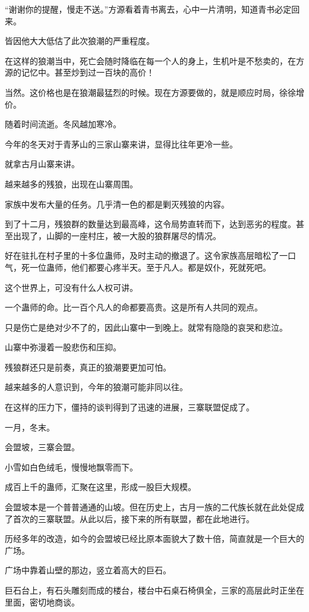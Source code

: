 \begin{this_body}
“谢谢你的提醒，慢走不送。”方源看着青书离去，心中一片清明，知道青书必定回来。

皆因他大大低估了此次狼潮的严重程度。

在这样的狼潮当中，死亡会随时降临在每一个人的身上，生机叶是不愁卖的，在方源的记忆中。甚至炒到过一百块的高价！

当然。这价格也是在狼潮最猛烈的时候。现在方源要做的，就是顺应时局，徐徐增价。

随着时间流逝。冬风越加寒冷。

今年的冬天对于青茅山的三家山寨来讲，显得比往年更冷一些。

就拿古月山寨来讲。

越来越多的残狼，出现在山寨周围。

家族中发布大量的任务。几乎清一色的都是剿灭残狼的内容。

到了十二月，残狼群的数量达到最高峰，这令局势直转而下，达到恶劣的程度。甚至出现了，山脚的一座村庄，被一大股的狼群屠尽的情况。

好在驻扎在村子里的十多位蛊师，及时主动的撤退了。这令家族高层暗松了一口气，死一位蛊师，他们都要心疼半天。至于凡人。都是奴仆，死就死吧。

这个世界上，可没有什么人权可讲。

一个蛊师的命。比一百个凡人的命都要高贵。这是所有人共同的观点。

只是伤亡是绝对少不了的，因此山寨中一到晚上。就常有隐隐的哀哭和悲泣。

山寨中弥漫着一股悲伤和压抑。

残狼群还只是前奏，真正的狼潮要更加可怕。

越来越多的人意识到，今年的狼潮可能非同以往。

在这样的压力下，僵持的谈判得到了迅速的进展，三寨联盟促成了。

一月，冬末。

会盟坡，三寨会盟。

小雪如白色绒毛，慢慢地飘零而下。

成百上千的蛊师，汇聚在这里，形成一股巨大规模。

会盟坡本是一个普普通通的山坡。但在历史上，古月一族的二代族长就在此处促成了首次的三寨联盟。从此以后，接下来的所有联盟，都在此地进行。

历经多年的改造，如今的会盟坡已经比原本面貌大了数十倍，简直就是一个巨大的广场。

广场中靠着山壁的那边，竖立着高大的巨石。

巨石台上，有石头雕刻而成的楼台，楼台中石桌石椅俱全，三家的高层此时正坐在里面，密切地商谈。


\end{this_body}
